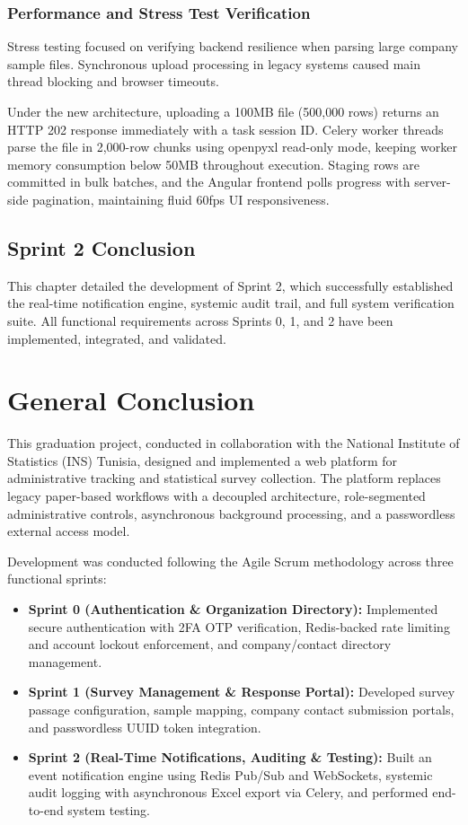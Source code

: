 \documentclass[12pt,a4paper]{report}
\begin{document}
\newpage
\subsection{Performance and Stress Test Verification}
Stress testing focused on verifying backend resilience when parsing large company sample files. Synchronous upload processing in legacy systems caused main thread blocking and browser timeouts. 

Under the new architecture, uploading a 100MB file (500,000 rows) returns an HTTP 202 response immediately with a task session ID. Celery worker threads parse the file in 2,000-row chunks using openpyxl read-only mode, keeping worker memory consumption below 50MB throughout execution. Staging rows are committed in bulk batches, and the Angular frontend polls progress with server-side pagination, maintaining fluid 60fps UI responsiveness.

\section{Sprint 2 Conclusion}
This chapter detailed the development of Sprint 2, which successfully established the real-time notification engine, systemic audit trail, and full system verification suite. All functional requirements across Sprints 0, 1, and 2 have been implemented, integrated, and validated.

\clearpage
\chapter*{General Conclusion}

This graduation project, conducted in collaboration with the National Institute of Statistics (INS) Tunisia, designed and implemented a web platform for administrative tracking and statistical survey collection. The platform replaces legacy paper-based workflows with a decoupled architecture, role-segmented administrative controls, asynchronous background processing, and a passwordless external access model.

Development was conducted following the Agile Scrum methodology across three functional sprints:
\begin{itemize}
    \item \textbf{Sprint 0 (Authentication \& Organization Directory):} Implemented secure authentication with 2FA OTP verification, Redis-backed rate limiting and account lockout enforcement, and company/contact directory management.
    \item \textbf{Sprint 1 (Survey Management \& Response Portal):} Developed survey passage configuration, sample mapping, company contact submission portals, and passwordless UUID token integration.
    \item \textbf{Sprint 2 (Real-Time Notifications, Auditing \& Testing):} Built an event notification engine using Redis Pub/Sub and WebSockets, systemic audit logging with asynchronous Excel export via Celery, and performed end-to-end system testing.
\end{itemize}
\end{document}
